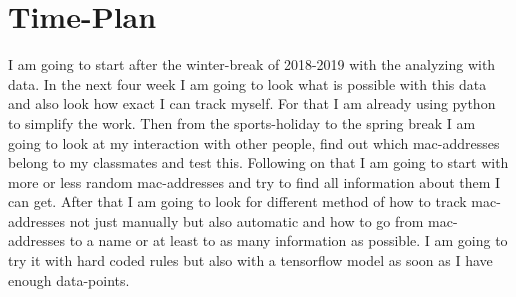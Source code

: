 \documentclass[paper=a4, fontsize=11pt]{scrartcl}
\begin{document}
\section{Time-Plan}
I am going to start after the winter-break of 2018-2019 with the analyzing with data. In the next four week I am going to look what is possible with this data and also look how exact I can track myself. For that I am already using python to simplify the work. Then from the sports-holiday to the spring break I am going to look at my interaction with other people, find out which mac-addresses belong to my classmates and test this. Following on that I am going to start with more or less random mac-addresses and try to find all information about them I can get. After that I am going to look for different method of how to track mac-addresses not just manually but also automatic and how to go from mac-addresses to a name or at least to as many information as possible. I am going to try it with hard coded rules but also with a tensorflow model as soon as I have enough data-points. 
\end{document}
